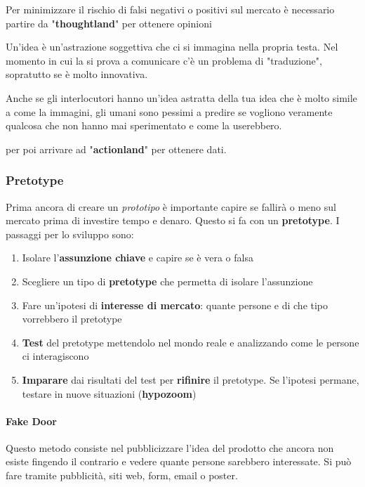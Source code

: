 Per minimizzare il rischio di falsi negativi o positivi sul mercato è necessario partire da "\textbf{thoughtland}" per ottenere opinioni
\begin{observation}
	Un'idea è un'astrazione soggettiva che ci si immagina nella propria testa. Nel momento in cui la si prova a comunicare c'è un problema di "traduzione", sopratutto se è molto innovativa.
\end{observation}
\begin{observation}
	Anche se gli interlocutori hanno un'idea astratta della tua idea che è molto simile a come la immagini, gli umani sono pessimi a predire se vogliono veramente qualcosa che non hanno mai sperimentato e come la userebbero.
\end{observation}
per poi arrivare ad "\textbf{actionland}" per ottenere dati.

\subsubsection{Pretotype}
Prima ancora di creare un \textit{prototipo} è importante capire se fallirà o meno sul mercato prima di investire tempo e denaro. Questo si fa con un \textbf{pretotype}. I passaggi per lo sviluppo sono:
\begin{enumerate}
	\item Isolare l'\textbf{assunzione chiave} e capire se è vera o falsa
	\item Scegliere un tipo di \textbf{pretotype} che permetta di isolare l'assunzione
	\item Fare un'ipotesi di \textbf{interesse di mercato}: quante persone e di che tipo vorrebbero il pretotype
	\item \textbf{Test} del pretotype mettendolo nel mondo reale e analizzando come le persone ci interagiscono
	\item \textbf{Imparare} dai risultati del test per \textbf{rifinire} il pretotype. Se l'ipotesi permane, testare in nuove situazioni (\textbf{hypozoom})
\end{enumerate}

\paragraph{Fake Door} Questo metodo consiste nel pubblicizzare l'idea del prodotto che ancora non esiste fingendo il contrario e vedere quante persone sarebbero interessate. Si può fare tramite pubblicità, siti web, form, email o poster.

